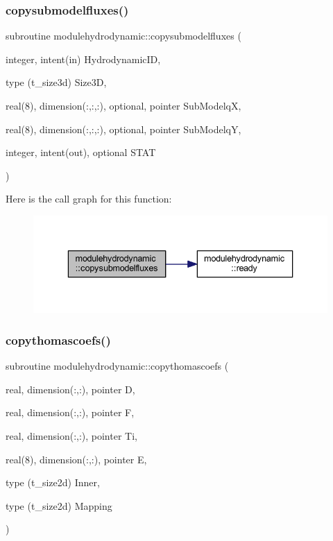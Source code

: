 \subsubsection{\texorpdfstring{copysubmodelfluxes()}{copysubmodelfluxes()}}
{\footnotesize\ttfamily subroutine modulehydrodynamic\+::copysubmodelfluxes (\begin{DoxyParamCaption}\item[{integer, intent(in)}]{Hydrodynamic\+ID,  }\item[{type (t\+\_\+size3d)}]{Size3D,  }\item[{real(8), dimension(\+:,\+:,\+:), optional, pointer}]{Sub\+ModelqX,  }\item[{real(8), dimension(\+:,\+:,\+:), optional, pointer}]{Sub\+ModelqY,  }\item[{integer, intent(out), optional}]{S\+T\+AT }\end{DoxyParamCaption})\hspace{0.3cm}{\ttfamily [private]}}

Here is the call graph for this function\+:\nopagebreak
\begin{figure}[H]
\begin{center}
\leavevmode
\includegraphics[width=336pt]{namespacemodulehydrodynamic_a69bb56671a822946694acb66f9417d61_cgraph}
\end{center}
\end{figure}
\mbox{\label{namespacemodulehydrodynamic_a080df16267de295975f460ddb4cba152}} 
\subsubsection{\texorpdfstring{copythomascoefs()}{copythomascoefs()}}
{\footnotesize\ttfamily subroutine modulehydrodynamic\+::copythomascoefs (\begin{DoxyParamCaption}\item[{real, dimension(\+:,\+:), pointer}]{D,  }\item[{real, dimension(\+:,\+:), pointer}]{F,  }\item[{real, dimension(\+:,\+:), pointer}]{Ti,  }\item[{real(8), dimension(\+:,\+:), pointer}]{E,  }\item[{type (t\+\_\+size2d)}]{Inner,  }\item[{type (t\+\_\+size2d)}]{Mapping }\end{DoxyParamCaption})\hspace{0.3cm}{\ttfamily [private]}}

